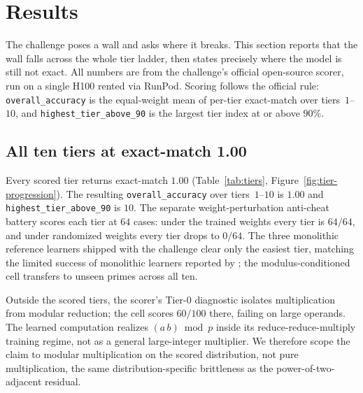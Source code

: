 \documentclass[11pt]{article}
\begin{document}
\section{Results}
\label{sec:results}

The challenge poses a wall and asks where it breaks. This section reports that the
wall falls across the whole tier ladder, then states precisely where the model is
still not exact. All numbers are from the challenge's official open-source scorer,
run on a single H100 rented via RunPod. Scoring follows the official rule:
\texttt{overall\_accuracy} is the equal-weight mean of per-tier exact-match over
tiers~$1$--$10$, and \texttt{highest\_tier\_above\_90} is the largest tier index at
or above $90\%$.

\subsection{All ten tiers at exact-match 1.00}
\label{sec:results:tiers}

Every scored tier returns exact-match $1.00$ (Table~\ref{tab:tiers},
Figure~\ref{fig:tier-progression}). The resulting \texttt{overall\_accuracy} over
tiers~$1$--$10$ is $1.00$ and \texttt{highest\_tier\_above\_90} is $10$. The separate
weight-perturbation anti-cheat battery scores each tier at $64$ cases: under the
trained weights every tier is $64/64$, and under randomized weights every tier drops
to $0/64$. The three monolithic
reference learners shipped with the challenge clear only the easiest tier, matching
the limited success of monolithic learners reported by \citet{lauter2024modular}; the
modulus-conditioned cell transfers to unseen primes across all ten.

Outside the scored tiers, the scorer's Tier-0 diagnostic isolates multiplication from
modular reduction; the cell scores $60/100$ there, failing on large operands. The learned
computation realizes $(a\,b)\bmod p$ inside its reduce-reduce-multiply training regime,
not as a general large-integer multiplier. We therefore scope the claim to modular
multiplication on the scored distribution, not pure multiplication, the same
distribution-specific brittleness as the power-of-two-adjacent residual.
\end{document}
